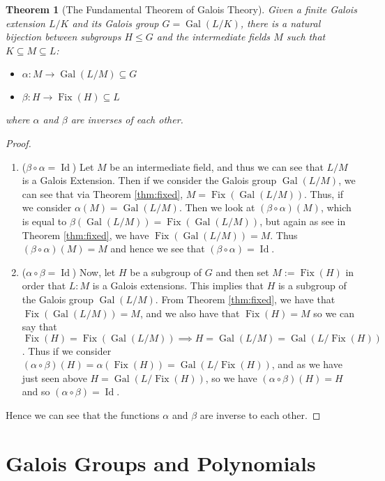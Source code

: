 \documentclass[12pt]{article}
\newtheorem{theorem}{Theorem}
\newcommand{\Gal}{\operatorname{Gal}}
\newcommand{\Fix}{\operatorname{Fix}}
\newcommand{\Id}{\operatorname{Id}}
\begin{document}
\begin{theorem}[The Fundamental Theorem of Galois Theory] \label{thm:fundamental-theorem} Given a finite Galois extension $L/K$ and its Galois group $G = \Gal(L/K)$, there is a natural bijection between subgroups $H\leq G$ and the intermediate fields $M$ such that $K \subseteq M \subseteq L$:

\begin{itemize}
    \item $\alpha:M \to \Gal(L/M) \subseteq G$
    \item $\beta:H \to \Fix(H) \subseteq L$
\end{itemize}
where $\alpha$ and $\beta$ are inverses of each other.
\end{theorem}
\begin{proof}
\begin{enumerate}[label=(\roman*)]

 \item ($\beta \circ \alpha = \Id$) Let $M$ be an intermediate field, and thus we can see that $L/M$ is a Galois Extension. Then if we consider the Galois group $\Gal(L/M)$, we can see that via Theorem \ref{thm:fixed}, $M = \Fix(\Gal(L/M))$. Thus, if we consider $\alpha(M) = \Gal(L/M)$. Then we look at $(\beta \circ \alpha)(M)$, which is equal to $\beta(\Gal(L/M)) = \Fix(\Gal(L/M))$, but again as see in Theorem \ref{thm:fixed}, we have $\Fix(\Gal(L/M)) = M$. Thus $(\beta \circ \alpha)(M) = M$ and hence we see that $(\beta \circ \alpha) = \Id$.

 \item ($\alpha \circ \beta = \Id$) Now, let $H$ be a subgroup of $G$ and then set $M :=\Fix(H)$ in order that $L:M$ is a Galois extensions. This implies that $H$ is a subgroup of the Galois group $\Gal(L/M)$. From Theorem \ref{thm:fixed}, we have that $\Fix(\Gal(L/M))=M$, and we also have that $\Fix(H) = M$ so we can say that $\Fix(H)=\Fix(\Gal(L/M)) \implies H = \Gal(L/M) = \Gal(L/\Fix(H))$. Thus if we consider $(\alpha \circ \beta)(H) = \alpha(\Fix(H)) = \Gal(L/\Fix(H))$, and as we have just seen above $H = \Gal(L/\Fix(H))$, so we have $(\alpha \circ \beta)(H) = H$ and so $(\alpha \circ \beta) = \Id$.
\end{enumerate}
Hence we can see that the functions $\alpha$ and $\beta$ are inverse to each other.
\end{proof}


\section{Galois Groups and Polynomials}
\end{document}
